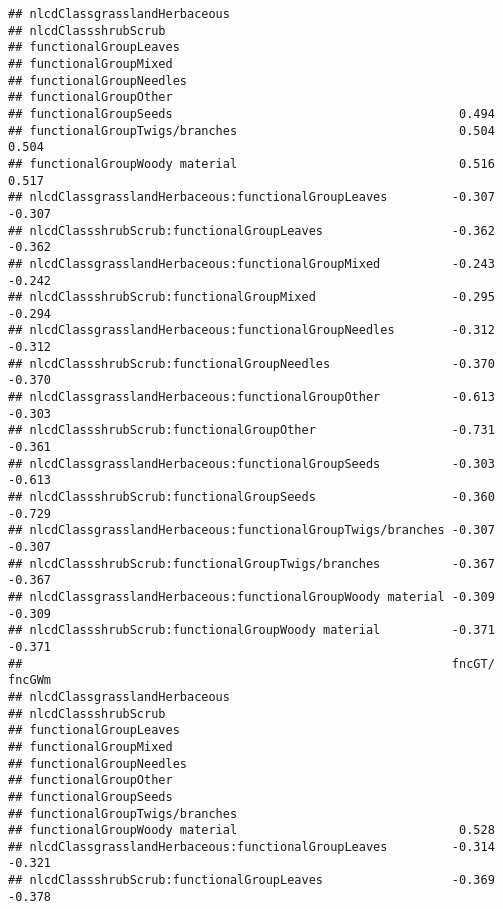 \documentclass[]{article}
\begin{document}
\begin{verbatim}
## nlcdClassgrasslandHerbaceous                                            
## nlcdClassshrubScrub                                                     
## functionalGroupLeaves                                                   
## functionalGroupMixed                                                    
## functionalGroupNeedles                                                  
## functionalGroupOther                                                    
## functionalGroupSeeds                                        0.494       
## functionalGroupTwigs/branches                               0.504  0.504
## functionalGroupWoody material                               0.516  0.517
## nlcdClassgrasslandHerbaceous:functionalGroupLeaves         -0.307 -0.307
## nlcdClassshrubScrub:functionalGroupLeaves                  -0.362 -0.362
## nlcdClassgrasslandHerbaceous:functionalGroupMixed          -0.243 -0.242
## nlcdClassshrubScrub:functionalGroupMixed                   -0.295 -0.294
## nlcdClassgrasslandHerbaceous:functionalGroupNeedles        -0.312 -0.312
## nlcdClassshrubScrub:functionalGroupNeedles                 -0.370 -0.370
## nlcdClassgrasslandHerbaceous:functionalGroupOther          -0.613 -0.303
## nlcdClassshrubScrub:functionalGroupOther                   -0.731 -0.361
## nlcdClassgrasslandHerbaceous:functionalGroupSeeds          -0.303 -0.613
## nlcdClassshrubScrub:functionalGroupSeeds                   -0.360 -0.729
## nlcdClassgrasslandHerbaceous:functionalGroupTwigs/branches -0.307 -0.307
## nlcdClassshrubScrub:functionalGroupTwigs/branches          -0.367 -0.367
## nlcdClassgrasslandHerbaceous:functionalGroupWoody material -0.309 -0.309
## nlcdClassshrubScrub:functionalGroupWoody material          -0.371 -0.371
##                                                            fncGT/ fncGWm
## nlcdClassgrasslandHerbaceous                                            
## nlcdClassshrubScrub                                                     
## functionalGroupLeaves                                                   
## functionalGroupMixed                                                    
## functionalGroupNeedles                                                  
## functionalGroupOther                                                    
## functionalGroupSeeds                                                    
## functionalGroupTwigs/branches                                           
## functionalGroupWoody material                               0.528       
## nlcdClassgrasslandHerbaceous:functionalGroupLeaves         -0.314 -0.321
## nlcdClassshrubScrub:functionalGroupLeaves                  -0.369 -0.378

\end{verbatim}
\end{document}
